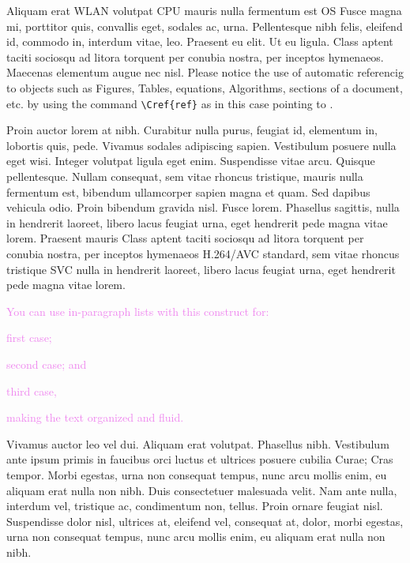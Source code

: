 Aliquam erat \ac{WLAN} volutpat \ac{CPU} mauris nulla fermentum est \ac{OS} Fusce magna mi, porttitor quis, convallis eget, sodales ac, urna.
Pellentesque nibh felis, eleifend id, commodo in, interdum vitae, leo. Praesent eu elit. Ut eu ligula. Class aptent taciti sociosqu ad litora torquent per conubia nostra, per inceptos hymenaeos. Maecenas elementum augue nec nisl. Please notice the use of automatic referencig to objects such as Figures, Tables, equations, Algorithms, sections of a document, etc. by using the command \verb:\Cref{ref}: as in this case pointing to .


Proin auctor lorem at nibh. Curabitur nulla purus, feugiat id, elementum in, lobortis quis, pede. Vivamus sodales adipiscing sapien. Vestibulum posuere nulla eget wisi. Integer volutpat ligula eget enim. Suspendisse vitae arcu. Quisque pellentesque. Nullam consequat, sem vitae rhoncus tristique, mauris nulla fermentum est, bibendum ullamcorper sapien magna et quam. Sed dapibus vehicula odio. Proin bibendum gravida nisl. Fusce lorem. Phasellus sagittis, nulla in hendrerit laoreet, libero lacus feugiat urna, eget hendrerit pede magna vitae lorem. Praesent mauris Class aptent taciti sociosqu ad litora torquent per conubia nostra, per inceptos hymenaeos H.264\slash \ac{AVC} standard, sem vitae rhoncus tristique \ac{SVC} \cite{Fraunhofer-Heinrich-Hertz-Institute:2013fk,ISO:H-264} nulla in hendrerit laoreet, libero lacus feugiat urna, eget hendrerit pede magna vitae lorem.

\textcolor{violet}{You can use in-paragraph lists with this construct for:
\begin{inparaenum}[(a)]
\item first case;
\item second case; and
\item third case,
\end{inparaenum}
making the text organized and fluid.}

Vivamus auctor leo vel dui. Aliquam erat volutpat. Phasellus nibh. Vestibulum ante ipsum primis in faucibus orci luctus et ultrices posuere cubilia Curae; Cras tempor. Morbi egestas, urna non consequat tempus, nunc arcu mollis enim, eu aliquam erat nulla non nibh. Duis consectetuer malesuada velit. Nam ante nulla, interdum vel, tristique ac, condimentum non, tellus. Proin ornare feugiat nisl. Suspendisse dolor nisl, ultrices at, eleifend vel, consequat at, dolor, morbi egestas, urna non consequat tempus, nunc arcu mollis enim, eu aliquam erat nulla non nibh.

